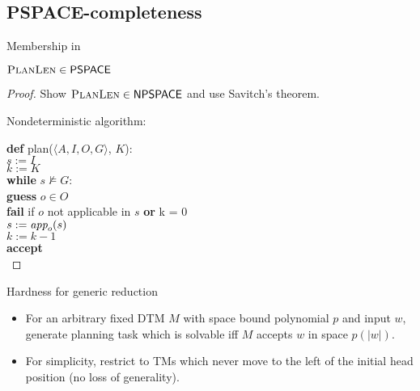 \documentclass{gkibeamer}
\begin{document}
\subsection{PSPACE-completeness}

\begin{frame}{Membership in \pspace}
  \begin{theorem}
    $\textsc{PlanLen} \in \textsf{\textup{PSPACE}}$
  \end{theorem}
  \begin{proof}
    Show $\textsc{PlanLen} \in \textsf{\textup{NPSPACE}}$ and use Savitch's theorem.

    Nondeterministic algorithm:

    \smallskip
    \small

    \textbf{def} plan($\langle A, I, O, G\rangle$, $K$): \\
    \hspace*{1cm} $s := I$ \\
    \hspace*{1cm} $k := K$ \\
    \hspace*{1cm} \textbf{while} $s \not\models G$: \\
    \hspace*{2cm} \textbf{guess} $o \in O$ \\
    \hspace*{2cm} \textbf{fail} if $o$ not applicable in $s$
    \textbf{or} k = 0\\
    \hspace*{2cm} $s := \textit{app}_{o}(s)$ \\
    \hspace*{2cm} $k := k-1$ \\
    \hspace*{1cm} \textbf{accept} \\
  \end{proof}
\end{frame}

\begin{frame}{Hardness for {\pspace}}
   \alert{generic reduction}

  \begin{itemize}
  \item For an \alert{arbitrary fixed DTM $M$} with space bound
    polynomial $p$ and input $w$, generate planning task which is
    solvable iff $M$ accepts $w$ in space $p(|w|)$.
  \item For simplicity, restrict to TMs which never move to the left
    of the initial head position (no loss of generality).
  \end{itemize}
\end{frame}
\end{document}
